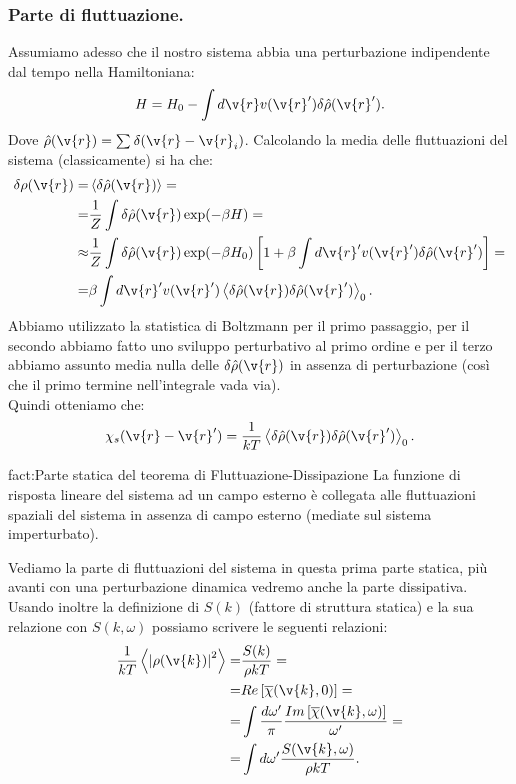 \subsubsection{Parte di fluttuazione.}%
Assumiamo adesso che il nostro sistema abbia una perturbazione indipendente dal tempo nella Hamiltoniana:
\[
    H= H_0 - \int d\v{r} v(\v{r}') \delta  \hat{\rho}(\v{r}') 
.\] 
Dove $ \hat{\rho}(\v{r}) = \sum_{}^{} \delta (\v{r}-\v{r}_i)$. Calcolando la media delle fluttuazioni del sistema (classicamente) si ha che:
\[\begin{aligned}
    \delta\rho (\v{r}) =& \left<\delta  \hat{\rho}(\v{r}) \right> =\\
    =&
    \frac{1}{Z}\int \delta  \hat{\rho}(\v{r}) \exp(-\beta H) = \\
    \approx &
    \frac{1}{Z}\int \delta  \hat{\rho}(\v{r}) \exp(-\beta  H_0)
    \left[1+\beta\int d\v{r}'v(\v{r}') \delta  \hat{\rho}(\v{r}')\right]=\\
    =&
    \beta\int d\v{r}'v(\v{r}')
    \left<\delta  \hat{\rho}(\v{r}) \delta\hat{\rho}(\v{r}') \right>_0
.\end{aligned}\]
Abbiamo utilizzato la statistica di Boltzmann per il primo passaggio, per il secondo abbiamo fatto uno sviluppo perturbativo al primo ordine e per il terzo abbiamo assunto media nulla delle $\delta\hat{\rho}(\v{r})$ in assenza di perturbazione (così che il primo termine nell'integrale vada via).\\
Quindi otteniamo che:
\[
    \chi_s(\v{r}-\v{r}') 
    = \frac{1}{kT}\left<\delta\hat{\rho}(\v{r})\delta\hat{\rho}(\v{r}')\right>_0
.\] 
\begin{fact}{fact:Parte statica del teorema di Fluttuazione-Dissipazione}
    La funzione di risposta lineare del sistema ad un campo esterno è collegata alle fluttuazioni spaziali del sistema in assenza di campo esterno (mediate sul sistema imperturbato).
\end{fact}
Vediamo la parte di fluttuazioni del sistema in questa prima parte statica, più avanti con una perturbazione dinamica vedremo anche la parte dissipativa.\\
Usando inoltre la definizione di $S(k)$ (fattore di struttura statica) e la sua relazione con $S(k,\omega)$ possiamo scrivere le seguenti relazioni:
\[\begin{aligned}
    \frac{1}{kT}\left<\left|\rho (\v{k}) \right|^2\right> = &
    \frac{S(k)}{\rho kT} =\\
    =&
    Re\left[\overline{\chi}(\v{k},0)\right] =\\
    =&
    \int \frac{d\omega'}{\pi} 
    \frac{Im\left[\overline{\chi}(\v{k},\omega)\right]}{\omega'} =\\
    =&
    \int d\omega' \frac{S(\v{k},\omega)}{\rho  kT}
.\end{aligned}\]

